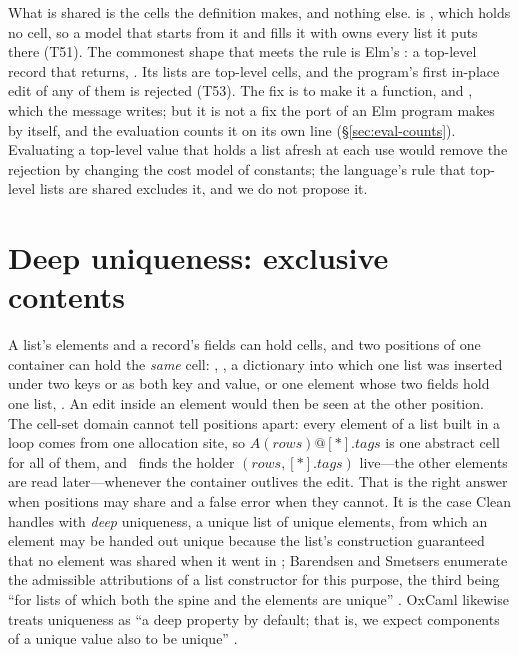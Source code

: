 What is shared is the cells the definition makes, and nothing else.  is
, which holds no cell, so a model that starts from it and fills it with
 owns every list it puts there (T51). The commonest shape that meets the rule is Elm's
: a top-level record that  returns, . Its lists are top-level cells, and the program's first in-place edit of any of them is
rejected (T53). The fix is to make it a function,  and , which the message writes; but it is not a fix the port of an Elm program
makes by itself, and the evaluation counts it on its own line (\S\ref{sec:eval-counts}). Evaluating a
top-level value that holds a list afresh at each use would remove the rejection by changing the cost model
of constants; the language's rule that top-level lists are shared excludes it, and we do not propose it.

\section{Deep uniqueness: exclusive contents}
\label{sec:model-excl}

A list's elements and a record's fields can hold cells, and two positions of one container can hold
the \emph{same} cell: \code{[ r, r ]}, , a dictionary into which one list was
inserted under two keys or as both key and value, or one element whose two fields hold one list,
\code{[ \{ a = xs, b = xs \} ]}. An edit inside an element would then be seen at the other position.
The cell-set domain cannot tell positions apart: every element of a list built in a loop comes from
one allocation site, so $A(\mathit{rows})@[\ast].\mathit{tags}$ is one abstract cell for all of them,
and \Dead\ finds the holder $(\mathit{rows}, [\ast].\mathit{tags})$ live---the other elements are read
later---whenever the container outlives the edit. That is the right answer when positions may share
and a false error when they cannot. It is the case Clean handles with \emph{deep} uniqueness, a unique
list of unique elements, from which an element may be handed out unique because the list's
construction guaranteed that no element was shared when it went in \citep[\S9.2]{plasmeijer2011clean};
Barendsen and Smetsers enumerate the admissible attributions of a list constructor for this purpose,
the third being ``for lists of which both the spine and the elements are unique''
\citep[\S6]{barendsen1996uniqueness}. OxCaml likewise treats uniqueness as ``a deep property by
default; that is, we expect components of a unique value also to be unique''
\citep[\S2.1]{lorenzen2024oxidizing}.


